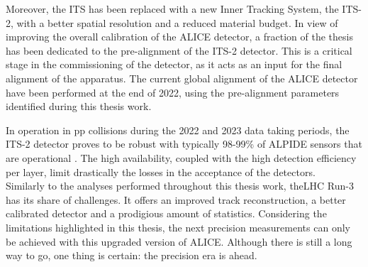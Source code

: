 Moreover, the ITS has been replaced with a new Inner Tracking System, the \mbox{ITS-2}, with a better spatial resolution and a reduced material budget. In view of improving the overall calibration of the ALICE detector, a fraction of the thesis has been dedicated to the pre-alignment of the ITS-2 detector. This is a critical stage in the commissioning of the detector, as it acts as an input for the final alignment of the apparatus. The current global alignment of the ALICE detector have been performed at the end of 2022, using the pre-alignment parameters identified during this thesis work.

In operation in pp collisions during the 2022 and 2023 data taking periods, the ITS-2 detector proves to be robust with typically 98-99\% of ALPIDE sensors that are operational \cite{alicecollaborationALICEUpgradesLHC2023}. The high availability, coupled with the high detection efficiency per layer, limit drastically the losses in the acceptance of the detectors.\\

%

Similarly to the analyses performed throughout this thesis work, the\break LHC Run-3 has its share of challenges. It offers an improved track reconstruction, a better calibrated detector and a prodigious amount of statistics. Considering the limitations highlighted in this thesis, the next precision measurements can only be achieved with this upgraded version of ALICE. Although there is still a long way to go, one thing is certain: the precision era is ahead.


